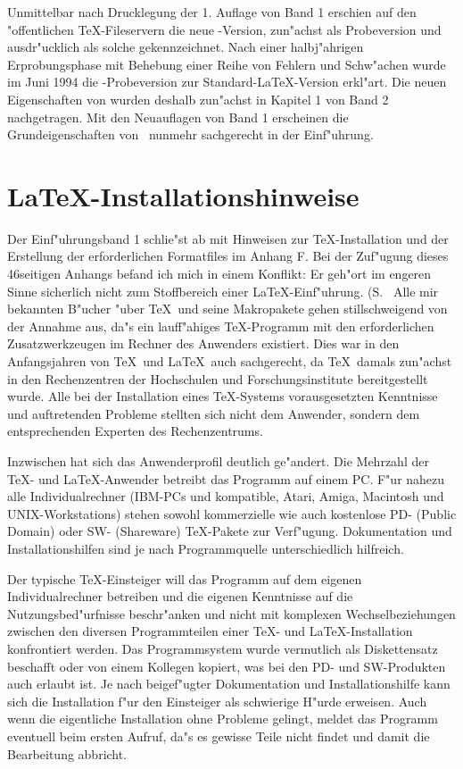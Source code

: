 \documentclass{report}
\begin{document}
Unmittelbar nach Drucklegung der 1. Auflage von Band 1 erschien auf den
"offentlichen \TeX-Fileservern die neue \LaTeXe-Version, zun"achst als
Probeversion und ausdr"ucklich als solche gekennzeichnet. Nach einer
halbj"ahrigen Erprobungsphase mit Behebung einer Reihe von Fehlern und
Schw"achen wurde im Juni 1994 die \LaTeXe-Probeversion zur
Standard-\LaTeX-Version erkl"art. Die neuen Eigenschaften von \LaTeXe wurden
deshalb zun"achst in Kapitel 1 von Band 2 nachgetragen. Mit den Neuauflagen
von Band 1 erscheinen die Grundeigenschaften
von \LaTeXe\ nunmehr sachgerecht in der Einf"uhrung. 

\section{\LaTeX-Installationshinweise}
Der Einf"uhrungsband 1 schlie"st ab mit Hinweisen zur \TeX-Installation und der
Erstellung der erforderlichen Formatfiles im Anhang F. 
Bei der Zuf"ugung dieses 46seitigen Anhangs befand ich mich in einem Konflikt:
Er geh"ort im engeren Sinne sicherlich nicht zum Stoffbereich einer 
\LaTeX-Einf"uhrung. (S.~\cite[Anh. F]{hk1}
Alle mir bekannten B"ucher "uber \TeX\ und seine Makropakete gehen
stillschweigend von der Annahme aus, da"s ein lauff"ahiges \TeX-Programm
mit den erforderlichen Zusatzwerkzeugen im Rechner des Anwenders existiert.
Dies war in den Anfangsjahren von \TeX\ und \LaTeX\ auch sachgerecht, da
\TeX\ damals zun"achst in den Rechenzentren der Hochschulen und 
Forschungsinstitute bereitgestellt wurde. Alle bei der Installation eines
\TeX-Systems vorausgesetzten Kenntnisse und auftretenden Probleme stellten
sich nicht dem Anwender, sondern dem entsprechenden Experten des
Rechenzentrums.

Inzwischen hat sich das Anwenderprofil deutlich ge"andert. Die Mehrzahl
der \TeX- und \LaTeX-Anwender betreibt das Programm auf einem PC. 
F"ur nahezu alle Individualrechner (IBM-PCs und kompatible, Atari, Amiga,
Macintosh und UNIX-Workstations) stehen sowohl kommerzielle wie auch
kostenlose PD- (Public Domain) oder SW- (Shareware) \TeX-Pakete zur 
Verf"ugung. Dokumentation und Installationshilfen sind je nach Programmquelle
unterschiedlich hilfreich. 

Der typische \TeX-Einsteiger will das Programm auf dem eigenen 
Individualrechner betreiben und die eigenen Kenntnisse auf die 
Nutzungsbed"urfnisse beschr"anken und nicht mit komplexen Wechselbeziehungen
zwischen den diversen Programmteilen einer \TeX- und \LaTeX-Installation
konfrontiert werden. Das Programmsystem wurde vermutlich als Diskettensatz
beschafft oder von einem Kollegen kopiert, was bei den PD- und SW-Produkten
auch erlaubt ist. Je nach beigef"ugter Dokumentation und Installationshilfe
kann sich die Installation f"ur den Einsteiger als schwierige H"urde erweisen.
Auch wenn die eigentliche Installation ohne Probleme gelingt, meldet das
Programm eventuell beim ersten Aufruf, da"s es gewisse Teile nicht findet und
damit die Bearbeitung abbricht.          
\end{document}
